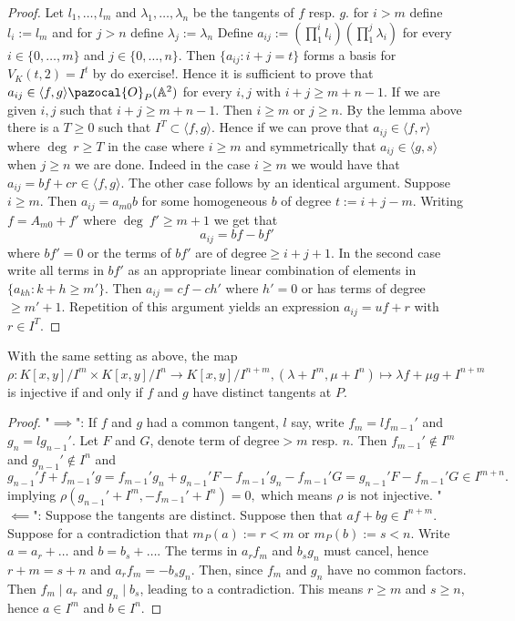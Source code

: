     \begin{proof}
        Let $l_1,\dots,l_m$ and $\lambda_1,\dots,\lambda_n$ be the tangents of $f$ resp. $g$. for $i>m$ define $l_i:=l_m$ and for $j>n$ define $\lambda_j:=\lambda_n$ Define $a_{ij} := \left(\prod_1^i l_i\right)\left(\prod_1^j \lambda_i\right)$ for every $i\in\{0,\dots,m\}$ and $j\in\{0,\dots,n\}$. Then $\{a_{ij}:i+j=t\}$ forms a basis for $V_K(t,2)=I^t$ by {\LARGE do exercise!}. Hence it is sufficient to prove that $a_{ij}\in \langle f,g\rangle \pazocal{O}_P(\A^2)$ for every $i,j$ with $i+j\geq m+n-1$. If we are given $i,j$ such that $i+j\geq m+n-1$. Then $i\geq m$ or $j\geq n$. By the lemma above there is a $T\geq 0$ such that $I^T\subset \langle f,g\rangle$. Hence if we can prove that $a_{ij} \in \langle f,r\rangle$ where $\deg \ r\geq T$ in the case where $i\geq m$ and symmetrically that $a_{ij}\in \langle g,s\rangle$ when $j\geq n$ we are done. Indeed in the case $i\geq m$ we would have that $a_{ij} = bf+cr\in \langle f,g\rangle$. The other case follows by an identical argument. Suppose $i\geq m$. Then $a_{ij}=a_{m0}b$ for some homogeneous $b$ of degree $t:=i+j-m$. Writing $f= A_{m0}+f'$ where $\deg \ f' \geq m+1$ we get that 
        $$a_{ij}=bf-bf'$$ where $bf'=0$ or the terms of $bf'$ are of degree$ \geq i+j+1$. In the second case write all terms in $bf'$ as an appropriate linear combination of elements in $\{a_{kh}: k+h\geq m'\}$. Then $a_{ij}= cf -ch'$ where $h'=0$ or has terms of degree $\geq m'+1$. Repetition of this argument yields an expression $a_{ij} = uf+r$ with $r\in I^T$.  
    \end{proof}
    \begin{lemma}\label{TechnicalIntersectionNumberLemma2}
        With the same setting as above, the map $\rho: K[x,y]/I^{m}\times K[x,y]/I^n \rightarrow K[x,y]/I^{n+m}, (\lambda + I^m,\mu + I^n)\mapsto \lambda f + \mu g + I^{n+m}$ is injective if and only if $f$ and $g$ have distinct tangents at $P$. 
    \end{lemma}
    \begin{proof}
        "$\implies$": If $f$ and $g$ had a common tangent, $l$ say, write $f_m = lf_{m-1}'$ and $g_n = lg_{n-1}'$. Let $F$ and $G$, denote term of degree$> m$ resp. $n$. Then $f_{m-1}'\notin I^m$ and $g_{n-1}'\notin I^n$ and 
        $$g_{n-1}'f+f_{m-1}'g= f_{m-1}'g_n+g_{n-1}'F-f_{m-1}'g_n-f_{m-1}'G =g_{n-1}'F-f_{m-1}'G\in I^{m+n}.$$
        implying $\rho(g_{n-1}'+I^m,-f_{m-1}'+I^n) = 0,$ which means $\rho$ is not injective.
        "$\impliedby$": Suppose the tangents are distinct. Suppose then that $af+bg\in I^{n+m}$. Suppose for a contradiction that $m_P(a):=r<m$ or $m_P(b):=s<n$. Write $a = a_r+\dots$ and $b=b_s+\dots$. The terms in $a_rf_m$ and $b_sg_n$ must cancel, hence $r+m = s+n$ and $a_rf_m=-b_sg_n$. Then, since $f_m$ and $g_n$ have no common factors. Then $f_m\mid a_r$ and $g_n\mid b_s$, leading to a contradiction. This means $r\geq m$ and $s\geq n$, hence $a\in I^m$ and $b\in I^n$. 
    \end{proof}
